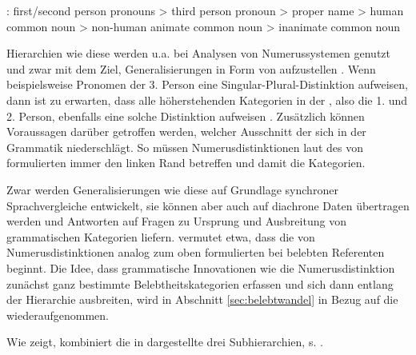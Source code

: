 \begin{exe}
	\ex \label{ex:dixon} : first/second person pronouns > third person pronoun > proper name > human common noun > non-human animate common noun > inanimate common noun
	\end{exe}
\noindent
Hierarchien  wie diese werden u.a. bei Analysen von Numerussystemen  genutzt \parencite{Corbett2000,Croft2006} und zwar mit dem Ziel, Generalisierungen in Form von  \parencite[2]{Zifonun2006} aufzustellen \parencite[vgl. auch][47]{Dahl1996}. Wenn beispielsweise Pronomen   der 3. Person eine Singular-Plural-Distinktion  aufweisen, dann ist zu erwarten, dass alle höherstehenden Kategorien in der , also die 1. und 2. Person, ebenfalls eine solche Distinktion aufweisen \parencite[129]{Croft2006}. Zusätzlich können Voraussagen darüber getroffen werden, welcher Ausschnitt der   sich in der Grammatik niederschlägt. So müssen Numerusdistinktionen  laut des von \textcite[56]{Corbett2000} formulierten  immer den linken Rand betreffen und damit die   Kategorien. 

Zwar werden Generalisierungen wie diese auf Grundlage synchroner Sprachvergleiche entwickelt, sie können aber auch auf diachrone Daten übertragen werden und Antworten auf Fragen zu Ursprung und Ausbreitung von grammatischen Kategorien liefern. \textcite[265--267]{Corbett2000} vermutet etwa, dass die  von Numerusdistinktionen   analog zum oben formulierten  bei belebten  Referenten beginnt. Die Idee, dass grammatische Innovationen wie die Numerusdistinktion  zunächst ganz bestimmte Belebtheitskategorien  erfassen und sich dann entlang der Hierarchie  ausbreiten, wird in Abschnitt \ref{sec:belebtwandel} in Bezug auf die  wiederaufgenommen. 

Wie \textcite[130]{Croft2006} zeigt, kombiniert die in  dargestellte   drei Subhierarchien, s. .

